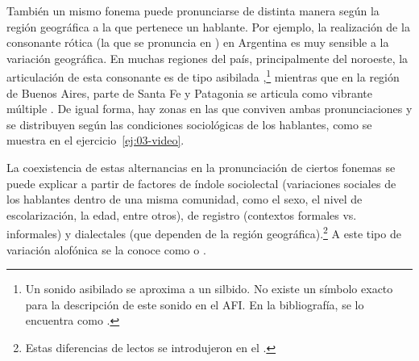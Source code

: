 También un mismo fonema puede pronunciarse de distinta manera según la región
geográfica a la que pertenece un hablante. Por ejemplo, la realización de la
consonante rótica  (la que se pronuncia en ) en
Argentina es muy sensible a la variación geográfica. En muchas regiones del
país, principalmente del noroeste, la articulación de esta consonante es de tipo
asibilada ,\footnote{Un sonido asibilado se aproxima a un silbido. No
existe un símbolo exacto para la descripción de este sonido en el AFI. En la
bibliografía, se lo encuentra como .} mientras que en la región de
Buenos Aires, parte de Santa Fe y Patagonia se articula como vibrante múltiple
. De igual forma, hay zonas en las que conviven ambas pronunciaciones y
se distribuyen según las condiciones sociológicas de los hablantes, como se
muestra en el ejercicio~\ref{ej:03-video}.

La coexistencia de estas alternancias en la pronunciación de ciertos fonemas se
puede explicar a partir de factores de índole sociolectal (variaciones sociales
de los hablantes dentro de una misma comunidad, como el sexo, el nivel de
escolarización, la edad, entre otros), de registro (contextos formales vs.
informales) y dialectales (que dependen de la región
geográfica).\footnote{Estas diferencias de lectos se introdujeron en el
.} A este tipo de variación alofónica se la conoce como
 o .


